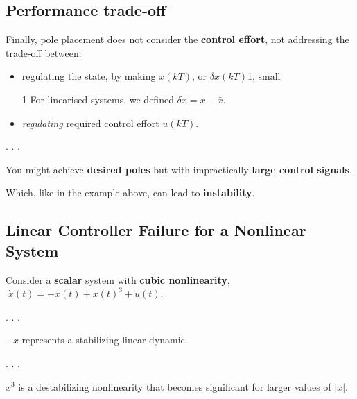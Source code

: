 \documentclass[
  letterpaper,
  DIV=11,
  numbers=noendperiod,
  oneside]{scrartcl}
\begin{document}
\subsection{Performance trade-off}\label{performance-trade-off}

Finally, pole placement does not consider the \textbf{control effort},
not addressing the trade-off between:

\begin{itemize}
\item
  regulating the state, by making \(x(kT)\), or \(\delta x(kT)\)1, small

  1 For linearised systems, we defined \(\delta x = x - \bar x\).
\item
  \emph{regulating} required control effort \(u(kT)\).
\end{itemize}

. . .

\begin{tcolorbox}[enhanced jigsaw, rightrule=.15mm, coltitle=black, titlerule=0mm, breakable, title=\textcolor{quarto-callout-important-color}{\faExclamation}\hspace{0.5em}{Important}, bottomrule=.15mm, colback=white, toprule=.15mm, opacityback=0, opacitybacktitle=0.6, leftrule=.75mm, left=2mm, colbacktitle=quarto-callout-important-color!10!white, bottomtitle=1mm, toptitle=1mm, arc=.35mm, colframe=quarto-callout-important-color-frame]

You might achieve \textbf{desired poles} but with impractically
\textbf{large control signals}.

Which, like in the example above, can lead to \textbf{instability}.

\end{tcolorbox}

\subsection{Linear Controller Failure for a Nonlinear
System}\label{linear-controller-failure-for-a-nonlinear-system}

Consider a \textbf{scalar} system with \textbf{cubic nonlinearity},
\(\; \dot{x}(t) = -x(t) + x(t)^3 + u(t)\).

. . .

\(-x\) represents a stabilizing linear dynamic.

. . .

\(x^3\) is a destabilizing nonlinearity that becomes significant for
larger values of \(|x|\).
\end{document}
